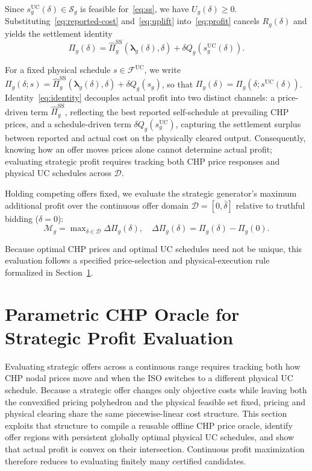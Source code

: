 \documentclass[journal]{IEEEtran}
\newcommand{\blambda}{\bm\lambda}
\newcommand{\UC}{\mathrm{UC}}
\newcommand{\SSched}{\mathrm{SS}}
\begin{document}
Since $s_g^{\UC}(\delta)\in\mathcal{S}_g$ is feasible for~\eqref{eq:ss}, we have $U_g(\delta)\ge 0$. Substituting~\eqref{eq:reported-cost} and~\eqref{eq:uplift} into~\eqref{eq:profit} cancels $R_g(\delta)$ and yields the settlement identity
\begin{equation}
\Pi_g(\delta) = \widehat{\Pi}_g^{\SSched}(\blambda_g(\delta),\delta)
+ \delta Q_g(s_g^{\UC}(\delta)).\label{eq:identity}
\end{equation}

For a fixed physical schedule $s\!\!\in\!\!\mathcal{F}^{\UC}$, we write $\Pi_g(\delta;s)\!\!=\!\!\widehat{\Pi}_g^{\SSched}(\blambda_g(\delta),\delta)\!\!+\!\!\delta Q_g(s_g)$, so that $\Pi_g(\delta)\!\!=\!\!\Pi_g(\delta;s^{\UC}(\delta))$. Identity~\eqref{eq:identity} decouples actual profit into two distinct channels: a price-driven term $\widehat{\Pi}_g^{\SSched}$, reflecting the best reported self-schedule at prevailing CHP prices, and a schedule-driven term $\delta Q_g(s_g^{\UC})$, capturing the settlement surplus between reported and actual cost on the physically cleared output. Consequently, knowing how an offer moves prices alone cannot determine actual profit; evaluating strategic profit requires tracking both CHP price responses and physical UC schedules across $\mathcal{D}$.


Holding competing offers fixed, we evaluate the strategic generator's maximum additional profit over the continuous offer domain $\mathcal{D}=[0,\bar\delta]$ relative to truthful bidding ($\delta=0$):
\begin{equation}
\mathcal{M}_g = \max\nolimits_{\delta\in\mathcal{D}}\Delta\Pi_g(\delta), \quad
\Delta\Pi_g(\delta) = \Pi_g(\delta) - \Pi_g(0).\label{eq:marketpower}
\end{equation}

Because optimal CHP prices and optimal UC schedules need not be unique, this evaluation follows a specified price-selection and physical-execution rule formalized in Section~\ref{sec:method}.

\section{Parametric CHP Oracle for Strategic Profit Evaluation}
\label{sec:method}
Evaluating strategic offers across a continuous range requires tracking both how CHP nodal prices move and when the ISO switches to a different physical UC schedule. Because a strategic offer changes only objective costs while leaving both the convexified pricing polyhedron and the physical feasible set fixed, pricing and physical clearing share the same piecewise-linear cost structure. This section exploits that structure to compile a reusable offline CHP price oracle, identify offer regions with persistent globally optimal physical UC schedules, and show that actual profit is convex on their intersection. Continuous profit maximization therefore reduces to evaluating finitely many certified candidates.
\end{document}
